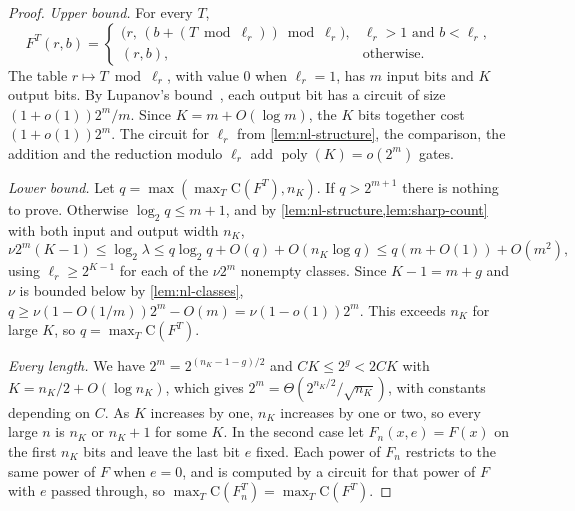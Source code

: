 \documentclass[11pt]{article}
\theoremstyle{definition}
\theoremstyle{remark}
\newcommand{\CC}{\mathrm{C}}
\newcommand{\poly}{\operatorname{poly}}
\numberwithin{equation}{section}
\begin{document}
\begin{proof}
\emph{Upper bound.}  For every $T$,
\[
  F^T(r,b)=
  \begin{cases}
    \bigl(r,\,(b+(T\bmod\ell_r))\bmod\ell_r\bigr),&\ell_r>1\text{ and }b<\ell_r,\\
    (r,b),&\text{otherwise}.
  \end{cases}
\]
The table $r\mapsto T\bmod\ell_r$, with value $0$ when $\ell_r=1$, has $m$
input bits and $K$ output bits.  By Lupanov's bound~\cite{Lupanov58},
each output bit has a circuit of size $(1+o(1))2^m/m$.  Since
$K=m+O(\log m)$, the $K$ bits together cost $(1+o(1))2^m$.  The circuit
for $\ell_r$ from \cref{lem:nl-structure}, the comparison, the addition
and the reduction modulo $\ell_r$ add $\poly(K)=o(2^m)$ gates.

\emph{Lower bound.}  Let $q=\max(\max_T\CC(F^T),n_K)$.  If $q>2^{m+1}$
there is nothing to prove.  Otherwise $\log_2q\leq m+1$, and by
\cref{lem:nl-structure,lem:sharp-count} with both input and output width $n_K$,
\[
  \nu2^m(K-1)\leq\log_2\lambda\leq q\log_2q+O(q)+O(n_K\log q)
  \leq q(m+O(1))+O(m^2),
\]
using $\ell_r\geq2^{K-1}$ for each of the $\nu2^m$ nonempty classes.
Since $K-1=m+g$ and $\nu$ is bounded below by \cref{lem:nl-classes},
$q\geq\nu(1-O(1/m))2^m-O(m)=\nu(1-o(1))2^m$.  This exceeds $n_K$ for
large $K$, so $q=\max_T\CC(F^T)$.

\emph{Every length.}  We have $2^m=2^{(n_K-1-g)/2}$ and
$CK\leq2^g<2CK$ with $K=n_K/2+O(\log n_K)$, which gives
$2^m=\Theta(2^{n_K/2}/\sqrt{n_K})$, with constants depending on $C$.  As
$K$ increases by one, $n_K$ increases by one or two, so every large $n$
is $n_K$ or $n_K+1$ for some $K$.  In the second case let
$F_n(x,e)=F(x)$ on the first $n_K$ bits and leave the last bit $e$ fixed.
Each power of $F_n$ restricts to the same power of $F$ when $e=0$, and is
computed by a circuit for that power of $F$ with $e$ passed through, so
$\max_T\CC(F_n^T)=\max_T\CC(F^T)$.
\end{proof}
\end{document}
